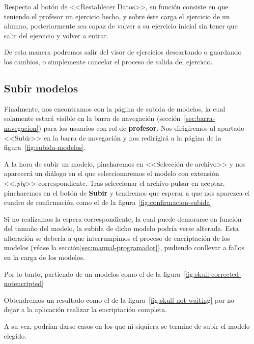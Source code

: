 Respecto al botón de <<Restablecer Datos>>, su función consiste en que teniendo el profesor un ejercicio hecho, y sobre éste carga el ejercicio de un alumno, posteriormente sea capaz de volver a su ejercicio inicial sin tener que salir del ejercicio y volver a entrar.

De esta manera podremos salir del visor de ejercicios descartando o guardando los cambios, o simplemente cancelar el proceso de salida del ejercicio.

\subsection{Subir modelos}\label{sec:subir-modelos}
Finalmente, nos encontramos con la página de subida de modelos, la cual solamente estará visible en la barra de navegación (sección~\ref{sec:barra-navegacion}) para los usuarios con rol de \textbf{profesor}. Nos dirigiremos al apartado <<Subir>> en la barra de navegación y nos redirigirá a la página de la figura~\ref{fig:subida-modelos}.

A la hora de subir un modelo, pincharemos en <<Selección de archivo>> y nos aparecerá un diálogo en el que seleccionaremos el modelo con extensión <<\textit{.ply}>> correspondiente. Tras seleccionar el archivo pulsar en aceptar, pincharemos en el botón de \textbf{Subir} y tendremos que esperar a que nos aparezca el cuadro de confirmación como el de la figura~\ref{fig:confirmacion-subida}.

Si no realizamos la espera correspondiente, la cual puede demorarse en función del tamaño del modelo, la subida de dicho modelo podría verse alterada. Esta alteración se debería a que interrumpimos el proceso de encriptación de los modelos (véase la sección\ref{sec:manual-programador}), pudiendo conllevar a fallos en la carga de los modelos.

Por lo tanto, partiendo de un modelos como el de la figura~\ref{fig:skull-corrected-notencripted}

Obtendremos un resultado como el de la figura~\ref{fig:skull-not-waiting} por no dejar a la aplicación realizar la encriptación completa.

A su vez, podrían darse casos en los que ni siquiera se termine de subir el modelo elegido.